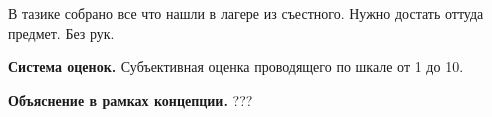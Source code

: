 
\par В тазике собрано все что нашли в лагере из съестного. Нужно достать оттуда предмет. Без рук.

\par \textbf{Система оценок.} Субъективная оценка проводящего по шкале от 1 до 10.

\par \textbf{Объяснение в рамках концепции.} ???